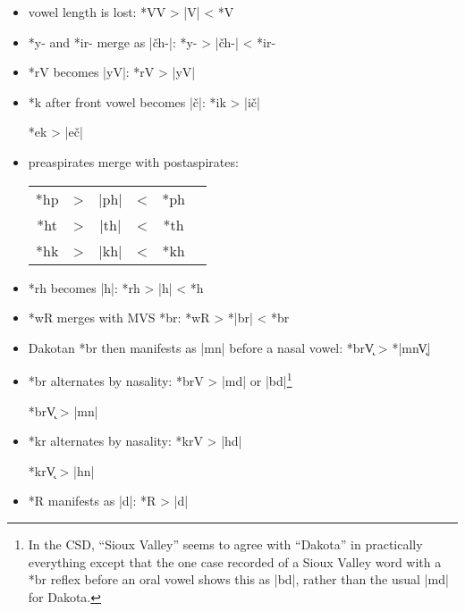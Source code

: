 \documentclass[output=paper]{LSP/langsci}
\begin{document}
\begin{itemize}
\item vowel length is lost: \hspace{4.2em} *VV	>	|V|	<	*V

\item *y- and *ir- merge as |\v{c}h-|: \hspace{2em} *y-	>	|\v{c}h-|	<	*ir-

\item *rV becomes |yV|:	 \hspace{5.3em} *rV	>	|yV|

\item *k after front vowel becomes |\v{c}|: \hspace{1em} *ik	>	|i\v{c}|

\hspace{14.2em} *ek	>	|e\v{c}|

\item preaspirates merge with postaspirates:



\begin{tabular}[t]{c c c c c c }
*hp & > & |ph| & < & *ph \\
*ht	& > & |th| & < & *th \\
*hk & > & |kh| & < & *kh \\
\end{tabular}

\item *rh becomes |h|: \hspace{4em} *rh	>	|h|	<	*h

\item *wR merges with MVS *br: \hspace{1em}*wR	>	*|br|	<	*br
\item  Dakotan *br then manifests as |mn| before a nasal vowel:              *br\k{V}    >          *|mn\k{V}|
\end{itemize}


\begin{itemize}
\item  *br alternates by nasality: \hspace{1em} *brV		>	|md| or |bd|\footnote{In the CSD, ``Sioux Valley'' seems to agree with ``Dakota'' in practically everything except that the one case recorded of a Sioux Valley word with a *br reflex before an oral vowel shows this as |bd|, rather than the usual |md| for Dakota.}

\hspace{12em} *br\k{V}	>	|mn|

\item  *kr alternates by nasality:  \hspace{1.2em} *krV       >          |hd|

\hspace{12em} *kr\k{V}	>	|hn|

\item *R manifests as |d|: \hspace{4.5em} *R	>	|d|
\end{itemize}
\end{document}
